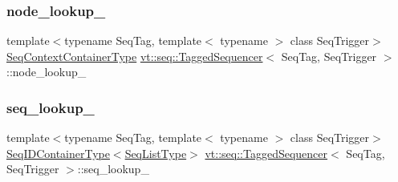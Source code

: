 \mbox{\label{structvt_1_1seq_1_1_tagged_sequencer_ac46610c41b21aa98b21b7eb508c39772}} 
\subsubsection{\texorpdfstring{node\+\_\+lookup\+\_\+}{node\_lookup\_}}
{\footnotesize\ttfamily template$<$typename Seq\+Tag, template$<$ typename $>$ class Seq\+Trigger$>$ \\
\hyperlink{structvt_1_1seq_1_1_tagged_sequencer_ad936050c5f6a8b28457e1056ed5dc57e}{Seq\+Context\+Container\+Type} \hyperlink{structvt_1_1seq_1_1_tagged_sequencer}{vt\+::seq\+::\+Tagged\+Sequencer}$<$ Seq\+Tag, Seq\+Trigger $>$\+::node\+\_\+lookup\+\_\+\hspace{0.3cm}{\ttfamily [private]}}

\mbox{\label{structvt_1_1seq_1_1_tagged_sequencer_ad2216351cd393dbbf256705109961166}} 
\subsubsection{\texorpdfstring{seq\+\_\+lookup\+\_\+}{seq\_lookup\_}}
{\footnotesize\ttfamily template$<$typename Seq\+Tag, template$<$ typename $>$ class Seq\+Trigger$>$ \\
\hyperlink{structvt_1_1seq_1_1_tagged_sequencer_a718515267468123a9036c30033d74237}{Seq\+I\+D\+Container\+Type}$<$\hyperlink{structvt_1_1seq_1_1_tagged_sequencer_a8df6e02cdb7c2b38870f7ee7776f6f9c}{Seq\+List\+Type}$>$ \hyperlink{structvt_1_1seq_1_1_tagged_sequencer}{vt\+::seq\+::\+Tagged\+Sequencer}$<$ Seq\+Tag, Seq\+Trigger $>$\+::seq\+\_\+lookup\+\_\+\hspace{0.3cm}{\ttfamily [private]}}

\mbox{\label{structvt_1_1seq_1_1_tagged_sequencer_a2c5fd9d4885dc33df2ee11111f9b76be}} 
